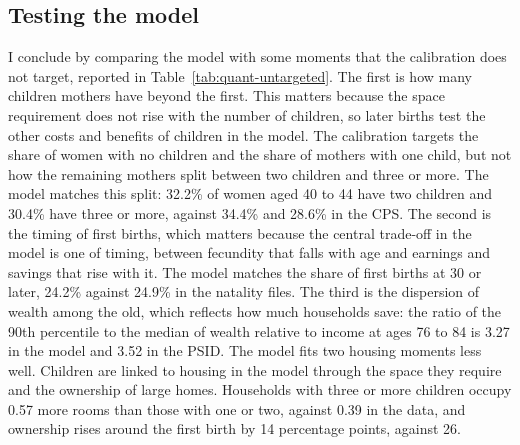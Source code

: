 \subsection{Testing the model}
\label{sec:quant-fit}

I conclude by comparing the model with some moments that the calibration
does not target, reported in Table~\ref{tab:quant-untargeted}. The first is
how many children mothers have beyond the first. This matters because the
space requirement does not rise with the number of children, so later births
test the other costs and benefits of children in the model. The calibration
targets the share of women with no children and the share of mothers with one
child, but not how the remaining mothers split between two children and three
or more. The model matches this split: 32.2\% of women aged 40 to 44 have two
children and 30.4\% have three or more, against 34.4\% and 28.6\% in the CPS.
The second is the timing of first births, which matters because the central
trade-off in the model is one of timing, between fecundity that falls with
age and earnings and savings that rise with it. The model matches the share
of first births at 30 or later, 24.2\% against 24.9\% in the natality files.
The third is the dispersion of wealth among the old, which reflects how much
households save: the ratio of the 90th percentile to the median of wealth
relative to income at ages 76 to 84 is 3.27 in the model and 3.52 in the
PSID. The model fits two housing moments less well. Children are linked to
housing in the model through the space they require and the ownership of
large homes. Households with three or more children occupy 0.57 more rooms
than those with one or two, against 0.39 in the data, and ownership rises
around the first birth by 14 percentage points, against 26.

